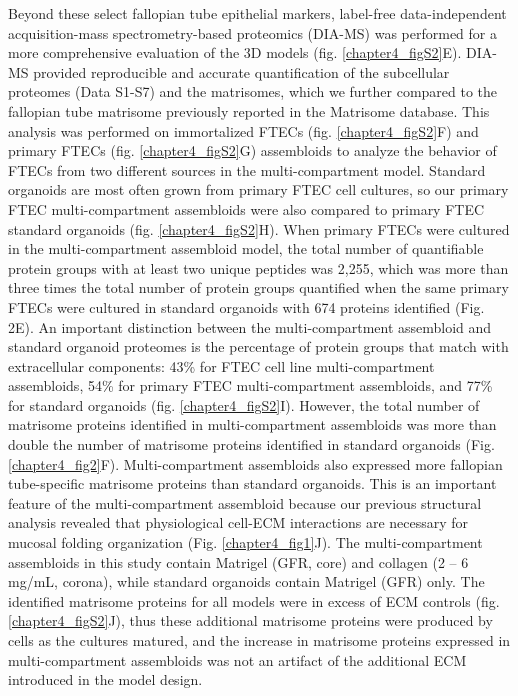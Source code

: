 \begin{refsection}
    Beyond these select fallopian tube epithelial markers, label-free data-independent acquisition-mass spectrometry-based proteomics (DIA-MS)\cite{gillet2012a,collins2017a,bons2023a,meier2020a} was performed for a more comprehensive evaluation of the 3D models (fig. \ref{chapter4_figS2}E). DIA-MS provided reproducible and accurate quantification of the subcellular proteomes (Data S1-S7)\cite{burton2022a,thul1979a} and the matrisomes\cite{bons2023a}, which we further compared to the fallopian tube matrisome previously reported in the Matrisome database\cite{shao2023a}. This analysis was performed on immortalized FTECs (fig. \ref{chapter4_figS2}F) and primary FTECs (fig. \ref{chapter4_figS2}G) assembloids to analyze the behavior of FTECs from two different sources in the multi-compartment model. Standard organoids are most often grown from primary FTEC cell cultures\cite{kessler2015a,clevers2016a}, so our primary FTEC multi-compartment assembloids were also compared to primary FTEC standard organoids (fig. \ref{chapter4_figS2}H). When primary FTECs were cultured in the multi-compartment assembloid model, the total number of quantifiable protein groups with at least two unique peptides was 2,255, which was more than three times the total number of protein groups quantified when the same primary FTECs were cultured in standard organoids with 674 proteins identified (Fig. 2E). An important distinction between the multi-compartment assembloid and standard organoid proteomes is the percentage of protein groups that match with extracellular components: 43\% for FTEC cell line multi-compartment assembloids, 54\% for primary FTEC multi-compartment assembloids, and 77\% for standard organoids (fig. \ref{chapter4_figS2}I). However, the total number of matrisome proteins identified in multi-compartment assembloids was more than double the number of matrisome proteins identified in standard organoids\cite{shao2023a} (Fig. \ref{chapter4_fig2}F). 
    Multi-compartment assembloids also expressed more fallopian tube-specific matrisome proteins than standard organoids. This is an important feature of the multi-compartment assembloid because our previous structural analysis revealed that physiological cell-ECM interactions are necessary for mucosal folding organization (Fig. \ref{chapter4_fig1}J). The multi-compartment assembloids in this study contain Matrigel (GFR, core) and collagen (2 – 6 mg/mL, corona), while standard organoids contain Matrigel (GFR) only. The identified matrisome proteins for all models were in excess of ECM controls (fig. \ref{chapter4_figS2}J), thus these additional matrisome proteins were produced by cells as the cultures matured, and the increase in matrisome proteins expressed in multi-compartment assembloids was not an artifact of the additional ECM introduced in the model design.

\end{refsection}
